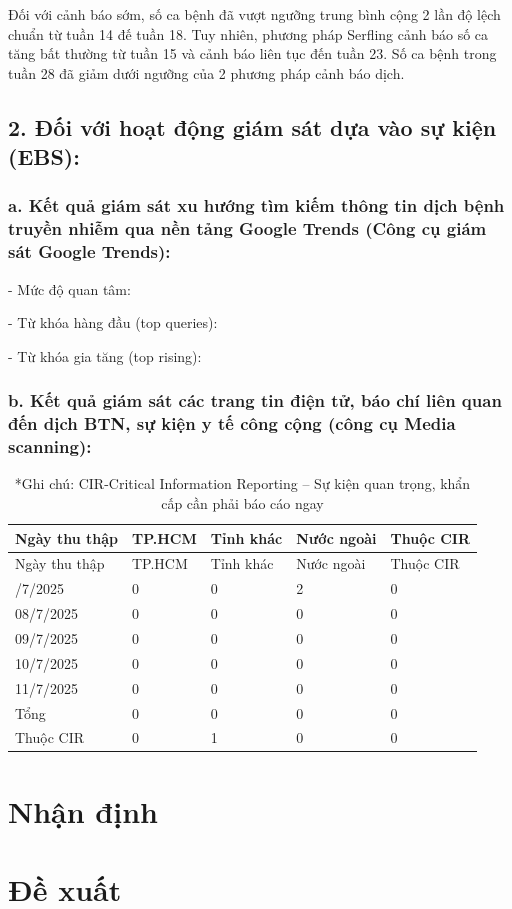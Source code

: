 \documentclass[
]{article}
\begin{document}
Đối với cảnh báo sớm, số ca bệnh đã vượt ngưỡng trung bình cộng 2 lần độ
lệch chuẩn từ tuần 14 đế tuần 18. Tuy nhiên, phương pháp Serfling cảnh
báo số ca tăng bất thường từ tuần 15 và cảnh báo liên tục đến tuần 23.
Số ca bệnh trong tuần 28 đã giảm dưới ngưỡng của 2 phương pháp cảnh báo
dịch.

\subsection{2. Đối với hoạt động giám sát dựa vào sự kiện
(EBS):}\label{ux111ux1ed1i-vux1edbi-houx1ea1t-ux111ux1ed9ng-giuxe1m-suxe1t-dux1ef1a-vuxe0o-sux1ef1-kiux1ec7n-ebs-1}

\subsubsection{a. Kết quả giám sát xu hướng tìm kiếm thông tin dịch bệnh
truyền nhiễm qua nền tảng Google Trends (Công cụ giám sát Google
Trends):}\label{a.-kux1ebft-quux1ea3-giuxe1m-suxe1t-xu-hux1b0ux1edbng-tuxecm-kiux1ebfm-thuxf4ng-tin-dux1ecbch-bux1ec7nh-truyux1ec1n-nhiux1ec5m-qua-nux1ec1n-tux1ea3ng-google-trends-cuxf4ng-cux1ee5-giuxe1m-suxe1t-google-trends-1}

- Mức độ quan tâm:

- Từ khóa hàng đầu (top queries):

- Từ khóa gia tăng (top rising):

\subsubsection{b. Kết quả giám sát các trang tin điện tử, báo chí liên
quan đến dịch BTN, sự kiện y tế công cộng (công cụ Media
scanning):}\label{b.-kux1ebft-quux1ea3-giuxe1m-suxe1t-cuxe1c-trang-tin-ux111iux1ec7n-tux1eed-buxe1o-chuxed-liuxean-quan-ux111ux1ebfn-dux1ecbch-btn-sux1ef1-kiux1ec7n-y-tux1ebf-cuxf4ng-cux1ed9ng-cuxf4ng-cux1ee5-media-scanning-1}

\begin{longtable}[]{@{}lllll@{}}
\caption{*Ghi chú: CIR-Critical Information Reporting -- Sự kiện quan
trọng, khẩn cấp cần phải báo cáo ngay}\tabularnewline
\toprule\noalign{}
Ngày thu thập & TP.HCM & Tỉnh khác & Nước ngoài & Thuộc CIR \\
\midrule\noalign{}
\endfirsthead
\toprule\noalign{}
Ngày thu thập & TP.HCM & Tỉnh khác & Nước ngoài & Thuộc CIR \\
\midrule\noalign{}
\endhead
\bottomrule\noalign{}
\endlastfoot
07/7/2025 & 0 & 0 & 2 & 0 \\
08/7/2025 & 0 & 0 & 0 & 0 \\
09/7/2025 & 0 & 0 & 0 & 0 \\
10/7/2025 & 0 & 0 & 0 & 0 \\
11/7/2025 & 0 & 0 & 0 & 0 \\
Tổng & 0 & 0 & 0 & 0 \\
Thuộc CIR & 0 & 1 & 0 & 0 \\
\end{longtable}

\section{Nhận định}\label{nhux1eadn-ux111ux1ecbnh}

\section{Đề xuất}\label{ux111ux1ec1-xuux1ea5t}
\end{document}

